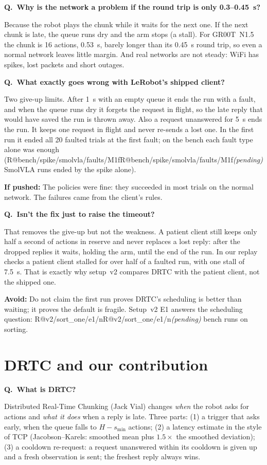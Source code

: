 \documentclass[11pt,a4paper]{article}
\makeatletter
\newcommand{\R}[1]{\ifcsname R@#1\endcsname\csname R@#1\endcsname\else\pending\fi}
\newcommand{\pending}{\textit{\color{warn}(pending)}}
\newcommand{\drtc}{DRTC}
\newcommand{\smolvla}{SmolVLA}
\newcommand{\groot}{GR00T~N1.5}
\newcounter{qn}
\newcommand{\q}[2]{\stepcounter{qn}\par\medskip
  {\bfseries\color{accent}Q\theqn.\ #1}\par\nopagebreak[4]#2\par}
\newcommand{\push}[1]{\par{\small\color{muted}\textbf{If pushed:} #1}}
\newcommand{\trap}[1]{\par{\small\color{warn}\textbf{Avoid:} #1}}
\makeatother
\begin{document}
\q{Why is the network a problem if the round trip is only 0.3--0.45~s?}{Because the robot plays the chunk while it
waits for the next one. If the next chunk is late, the queue runs dry and the arm stops (a stall). For \groot{} the
chunk is 16 actions, 0.53~s, barely longer than its 0.45~s round trip, so even a normal network leaves little margin.
And real networks are not steady: WiFi has spikes, lost packets and short outages.}

\q{What exactly goes wrong with LeRobot's shipped client?}{Two give-up limits. After 1~s with an empty queue it ends
the run with a fault, and when the queue runs dry it forgets the request in flight, so the late reply that would have
saved the run is thrown away. Also a request unanswered for 5~s ends the run. It keeps one request in flight and never
re-sends a lost one. In the first run it ended all 20 faulted trials at the first fault; on the bench each fault type
alone was enough (\R{bench/spike/smolvla/faults/M1f} \smolvla{} runs ended by the spike alone).}
\push{The policies were fine: they succeeded in most trials on the normal network. The failures came from the
client's rules.}

\q{Isn't the fix just to raise the timeout?}{That removes the give-up but not the weakness. A patient client still
keeps only half a second of actions in reserve and never replaces a lost reply: after the dropped replies it waits,
holding the arm, until the end of the run. In our replay checks a patient client stalled for over half of a faulted
run, with one stall of 7.5~s. That is exactly why setup~v2 compares \drtc{} with the patient client, not the shipped one.}
\trap{Do not claim the first run proves \drtc's scheduling is better than waiting; it proves the default is
fragile. Setup~v2 E1 answers the scheduling question: \R{v2/sort_one/e1/n} bench runs on sorting.}

\section{\drtc{} and our contribution}

\q{What is \drtc?}{Distributed Real-Time Chunking (Jack Vial) changes \emph{when} the robot asks for actions and
\emph{what it does} when a reply is late. Three parts: (1) a trigger that asks early, when the queue falls to
$H-s_{\min}$ actions; (2) a latency estimate in the style of TCP (Jacobson--Karels: smoothed mean plus $1.5\times$ the
smoothed deviation); (3) a cooldown re-request: a request unanswered within its cooldown is given up and a fresh
observation is sent; the freshest reply always wins.}
\end{document}
